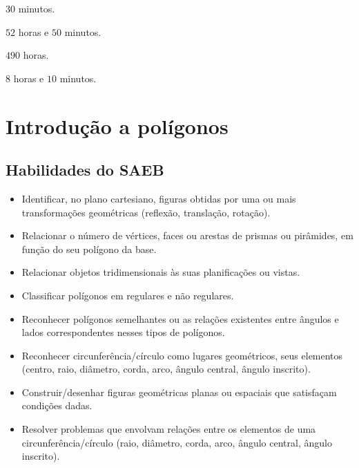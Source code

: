 \begin{multicols}{2}
\begin{escolha}
\item $30$ minutos.
\item $52$ horas e $50$ minutos.
\item $490$ horas.
\item $8$ horas e $10$ minutos.
\end{escolha}
\end{multicols}



\chapter{Introdução a polígonos}

\section*{Habilidades do SAEB} 
\begin{itemize}
\item Identificar, no plano cartesiano, figuras obtidas
por uma ou mais transformações geométricas (reflexão, translação,
rotação).
\item
  Relacionar o número de vértices, faces ou arestas de prismas ou
  pirâmides, em função do seu polígono da base.
\item
  Relacionar objetos tridimensionais às suas planificações ou vistas.
\item
  Classificar polígonos em regulares e não regulares.
\item
  Reconhecer polígonos semelhantes ou as relações existentes entre
  ângulos e lados correspondentes nesses tipos de polígonos.
\item
  Reconhecer circunferência/círculo como lugares geométricos, seus
  elementos (centro, raio, diâmetro, corda, arco, ângulo central, ângulo
  inscrito).
\item
  Construir/desenhar figuras geométricas planas ou espaciais que
  satisfaçam condições dadas.
\item
  Resolver problemas que envolvam relações entre os elementos de uma
  circunferência/círculo (raio, diâmetro, corda, arco, ângulo central,
  ângulo inscrito).
\end{itemize}

